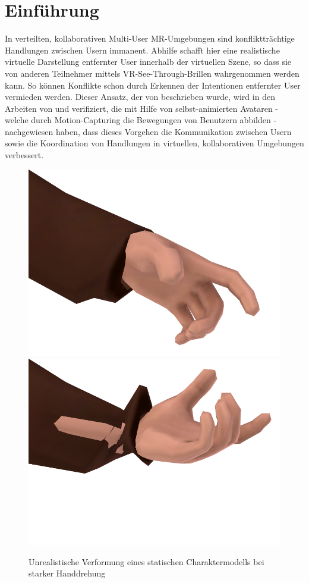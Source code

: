 \section{Einführung}
\label{sec:user_reconstruction}


In verteilten, kollaborativen Multi-User MR-Umgebungen sind konfliktträchtige 
Handlungen zwischen Usern immanent. Abhilfe schafft hier eine realistische 
virtuelle Darstellung entfernter User innerhalb der virtuellen Szene, so dass 
sie von anderen Teilnehmer mittels VR-See-Through-Brillen wahrgenommen werden 
kann. So können Konflikte schon durch Erkennen der Intentionen entfernter User 
vermieden werden. Dieser Ansatz, der von \cite{Cassell:2000:ECI:332051.332075} 
beschrieben wurde, wird in den Arbeiten von \cite{mcmanus2011influence} und 
\cite{dodds2011talk} verifiziert, die mit Hilfe von selbst-animierten Avataren 
- welche durch Motion-Capturing die Bewegungen von Benutzern abbilden - 
nachgewiesen haben, dass dieses Vorgehen die Kommunikation zwischen Usern sowie 
die Koordination von Handlungen in virtuellen, kollaborativen Umgebungen 
verbessert.

\begin{figure}[H]
	\centering
	\includegraphics[width=.3\textwidth]{figs/anim-ok}
	\includegraphics[width=.3\textwidth]{figs/anim-prob}
	\caption{Unrealistische Verformung eines statischen Charaktermodells bei 
	starker Handdrehung}
	\label{fig:animationproblem}
\end{figure}

